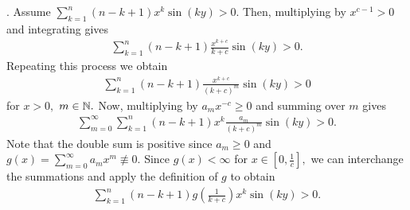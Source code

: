 \documentclass[final]{siamltex}
\begin{document}
\vspace {4 pt}


.  Assume $\sum_{k=1}^{n}(n-k+1)x^{k}\sin(ky) > 0.$ Then, multiplying by $x^{c-1} > 0$ and integrating gives
 \begin{eqnarray*}
   \sum_{k=1}^{n}(n-k+1)\frac{x^{k+c}}{k+c}\sin(ky) > 0. 
 \end{eqnarray*} 
 Repeating this process we obtain
 \begin{eqnarray*}   \sum_{k=1}^{n}(n-k+1)\frac{x^{k+c}}{(k+c)^{m}}\sin(ky) > 0 
  \end{eqnarray*}  for $x > 0,$ $m \in {\Bbb N}.$ Now, multiplying by $a_{m}x^{-c} \geq 0$ and summing over $m$ gives
 \begin{eqnarray*} 
    \sum_{m=0}^{\infty} \sum_{k=1}^{n}(n-k+1)x^{k}\frac{a_{m}}{(k+c)^{m}}\sin(ky) > 0.
 \end{eqnarray*}
 Note that the double sum is positive since $a_{m} \geq 0$ and $g(x) = \sum_{m=0}^{\infty} a_{m} x^{m} \not\equiv 0.$ Since $g(x) < \infty$ for $x \in [0, \frac{1}{c}],$ we can interchange the summations and apply the definition of $g$ to obtain
 \begin{eqnarray*}
  \sum_{k=1}^{n}(n-k+1)g \left( \frac{1}{k+c} \right)x^{k}\sin(ky) > 0. 
 \end{eqnarray*}

\vspace {4 pt}
\end{document}
